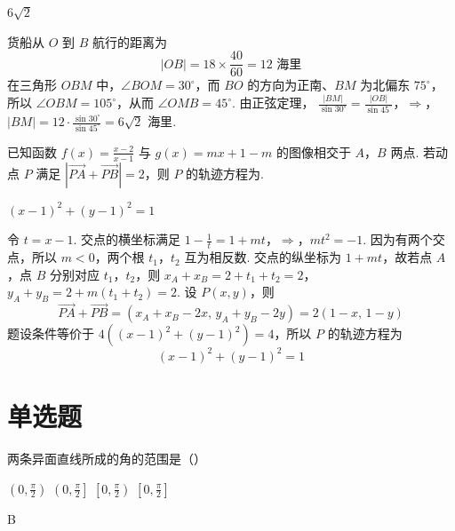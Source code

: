 \begin{answer}
\(6\sqrt{2}\)
\end{answer}

\begin{solution}
货船从 \(O\) 到 \(B\) 航行的距离为
\[
|OB|=18\times\frac{40}{60}=12\text{ 海里}
\]
在三角形 \(OBM\) 中，\(\angle BOM=30^\circ\)，而 \(BO\) 的方向为正南、\(BM\) 为北偏东 \(75^\circ\)，所以 \(\angle OBM=105^\circ\)，从而 \(\angle OMB=45^\circ\). 由正弦定理，
\(\frac{|BM|}{\sin30^\circ}=\frac{|OB|}{\sin45^\circ}\)，\(\Longrightarrow\)，\(|BM|=12\cdot\frac{\sin30^\circ}{\sin45^\circ}=6\sqrt2\text{ 海里}\).
\end{solution}

\begin{problem}
已知函数 \(f(x)=\frac{x-2}{x-1}\) 与 \(g(x)=mx+1-m\) 的图像相交于 \(A\)，\(B\) 两点. 若动点 \(P\) 满足 \(\left|\overrightarrow{PA}+\overrightarrow{PB}\right|=2\)，则 \(P\) 的轨迹方程为\fillinblank{}.
\end{problem}

\begin{answer}
\((x-1)^2+(y-1)^2=1\)
\end{answer}

\begin{solution}
令 \(t=x-1\). 交点的横坐标满足
\(1-\frac1t=1+mt\)，\(\Longrightarrow\)，\(mt^2=-1\).
因为有两个交点，所以 \(m<0\)，两个根 \(t_1\)，\(t_2\) 互为相反数. 交点的纵坐标为 \(1+mt\)，故若点 \(A\)，点 \(B\) 分别对应 \(t_1\)，\(t_2\)，则
\(x_A+x_B=2+t_1+t_2=2\)，\(y_A+y_B=2+m(t_1+t_2)=2\).
设 \(P(x,y)\)，则
\[
\overrightarrow{PA}+\overrightarrow{PB}
=(x_A+x_B-2x,\,y_A+y_B-2y)
=2(1-x,\,1-y)
\]
题设条件等价于 \(4((x-1)^2+(y-1)^2)=4\)，所以 \(P\) 的轨迹方程为
\[
(x-1)^2+(y-1)^2=1
\]
\end{solution}

\section{单选题}

\begin{problem}
两条异面直线所成的角的范围是（\quad）

\choices
    {\( \left(0, \frac{\pi}{2}\right) \)}
    {\( \left(0, \frac{\pi}{2}\right] \)}
    {\( \left[0, \frac{\pi}{2}\right) \)}
    {\( \left[0, \frac{\pi}{2}\right] \)}
\end{problem}

\begin{answer}
B
\end{answer}

